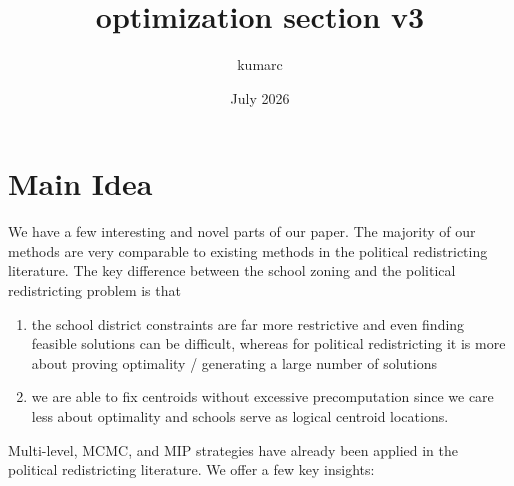 \documentclass{article}
\title{optimization section v3}
\author{kumarc}
\date{July 2026}
\begin{document}
\maketitle

\section{Main Idea}
We have a few interesting and novel parts of our paper. The majority of our methods are very comparable to existing methods in the political redistricting literature. The key difference between the school zoning and the political redistricting problem is that \begin{enumerate}
    \item the school district constraints are far more restrictive and even finding feasible solutions can be difficult, whereas for political redistricting it is more about proving optimality / generating a large number of solutions
    \item we are able to fix centroids without excessive precomputation since we care less about optimality and schools serve as logical centroid locations.
\end{enumerate} 
Multi-level, MCMC, and MIP strategies have already been applied in the political redistricting literature. We offer a few key insights:
\end{document}
